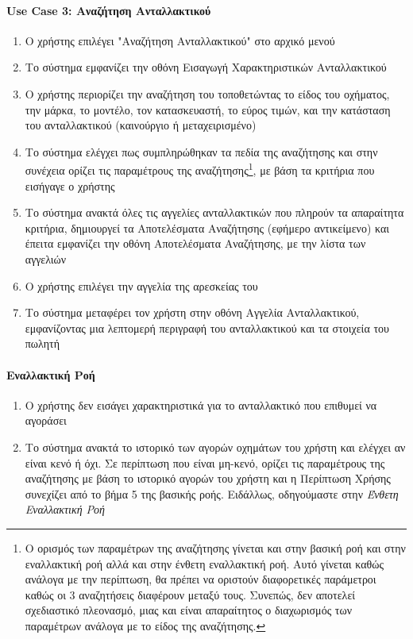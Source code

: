 \documentclass{../ol-softwaremanual}
\begin{document}
	
	
	
	\paragraph{\en Use Case 3: \gr Αναζήτηση Ανταλλακτικού}	
	
	\begin{enumerate}
		\item Ο χρήστης επιλέγει \en"\gr Αναζήτηση Ανταλλακτικού\en" \gr στο αρχικό μενού
		\item Το σύστημα εμφανίζει την οθόνη Εισαγωγή Χαρακτηριστικών Ανταλλακτικού
		\item Ο χρήστης περιορίζει την αναζήτηση του τοποθετώντας το είδος του οχήματος, την μάρκα, το μοντέλο, τον κατασκευαστή, το εύρος τιμών, και την κατάσταση του ανταλλακτικού (καινούργιο ή μεταχειρισμένο) 
		\item Το σύστημα ελέγχει πως συμπληρώθηκαν τα πεδία της αναζήτησης και στην συνέχεια ορίζει τις παραμέτρους της αναζήτησης\footnote[1]{Ο ορισμός των παραμέτρων της αναζήτησης γίνεται και στην βασική ροή και στην εναλλακτική ροή αλλά και στην ένθετη εναλλακτική ροή. Αυτό γίνεται καθώς ανάλογα με την περίπτωση, θα πρέπει να οριστούν διαφορετικές παράμετροι καθώς οι 3 αναζητήσεις διαφέρουν μεταξύ τους. Συνεπώς, δεν αποτελεί σχεδιαστικό πλεονασμό, μιας και είναι απαραίτητος ο διαχωρισμός των παραμέτρων ανάλογα με το είδος της αναζήτησης.}, με βάση τα κριτήρια που εισήγαγε ο χρήστης
		\item Το σύστημα ανακτά όλες τις αγγελίες ανταλλακτικών που πληρούν τα απαραίτητα κριτήρια, δημιουργεί τα Αποτελέσματα Αναζήτησης (εφήμερο αντικείμενο) και έπειτα εμφανίζει την οθόνη Αποτελέσματα Αναζήτησης, με την λίστα των αγγελιών
		\item Ο χρήστης επιλέγει την αγγελία της αρεσκείας του
		\item Το σύστημα μεταφέρει τον χρήστη στην οθόνη Αγγελία Ανταλλακτικού, εμφανίζοντας μια λεπτομερή περιγραφή του ανταλλακτικού και τα στοιχεία του πωλητή		
	\end{enumerate}
	
	\paragraph{Εναλλακτική Ροή}
	
	\begin{enumerate}
		\item Ο χρήστης δεν εισάγει χαρακτηριστικά για το ανταλλακτικό που επιθυμεί να αγοράσει
		\item Το σύστημα ανακτά το ιστορικό των αγορών οχημάτων του χρήστη και ελέγχει αν είναι κενό ή όχι. Σε περίπτωση που είναι μη-κενό, ορίζει τις παραμέτρους της αναζήτησης με βάση το ιστορικό αγορών του χρήστη και η Περίπτωση Χρήσης συνεχίζει από το βήμα 5 της βασικής ροής. Ειδάλλως, οδηγούμαστε στην \textit{Ένθετη Εναλλακτική Ροή}
		
	\end{enumerate}
	
\end{document}
